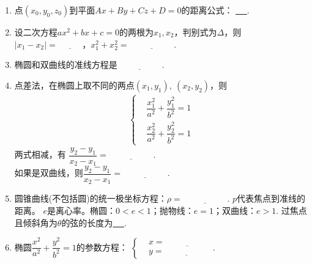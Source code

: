 \documentclass{article}
\newif\ifte
\newcommand{\q}{\quad}
\begin{document}
\begin{multicols}{2}
\begin{enumerate}[leftmargin=20pt]
\item 点$ (x_0,y_0,z_0) $到平面$ Ax+By+Cz+D=0 $的距离公式：
\underline{\ \ifte $ \dfrac{|Ax_0+By_0+Cz_0+D|}{\sqrt{A^2+B^2+C^2}} $
    \else \hspace{4cm} \fi\ }.

\item 设二次方程$ ax^2+bx+c=0 $的两根为$ x_1,x_2 $，判别式为$ \Delta $，则
$ |x_1-x_2|=\underline{\ \ifte \dfrac{\sqrt{\Delta}}{|a|}
    \else \hspace{1cm} \fi\ } $，$ x_1^2+x_2^2=\underline{\ \ifte 
    \dfrac{b^2-2ac}{a^2}\else \hspace{2cm} \fi\ } $.

\item 椭圆和双曲线的准线方程是$ \underline{\ \ifte 
   x=\pm \dfrac{a^2}{c} \else \hspace{2cm} \fi\ } $.

\item 点差法，在椭圆上取不同的两点$ (x_1,y_1),\ (x_2,y_2) $，则
\begin{align*}
    \left\{\begin{aligned}
        & \dfrac{x_1^2}{a^2}+\dfrac{y_1^2}{b^2}=1 \\
        & \dfrac{x_2^2}{a^2}+\dfrac{y_2^2}{b^2}=1 
    \end{aligned}\right.
\end{align*}
两式相减，有
$ \dfrac{y_2-y_1}{x_2-x_1}=\underline{\ \ifte 
 -\dfrac{b^2(x_2+x_1)}{y_2+y_1}\else \hspace{2cm} \fi\ } $. \\
如果是双曲线，则$ \dfrac{y_2-y_1}{x_2-x_1}=\underline{\ \ifte 
\dfrac{b^2(x_2+x_1)}{y_2+y_1}\else \hspace{2cm} \fi\ } $.

\item 圆锥曲线(不包括圆)的统一极坐标方程：$\rho= \underline{\ \ifte 
  \dfrac{ep}{1-e\cos \theta} \else \hspace{2cm} \fi\ } $. \q
$ p $代表焦点到准线的距离。
$ e $是离心率。椭圆：$ 0<e<1 $；抛物线：$ e=1 $；双曲线：$ e>1 $.
过焦点且倾斜角为$ \theta $的弦的长度为\underline{\ \ifte 
$ \dfrac{2ep}{1-e^2\cos^2 \theta} $\else \hspace{2cm} \fi\ }.

\item 椭圆$ \dfrac{x^2}{a^2}+\dfrac{y^2}{b^2}=1 $的参数方程：
$ \left\{ \begin{aligned}
    &x=\underline{\ \ifte a\cos \theta \else \hspace{2cm} \fi\ } \\
    &y=\underline{\ \ifte b\sin \theta \else \hspace{2cm} \fi\ }
\end{aligned} \right. $.


\end{enumerate}
\end{multicols}
\end{document}
